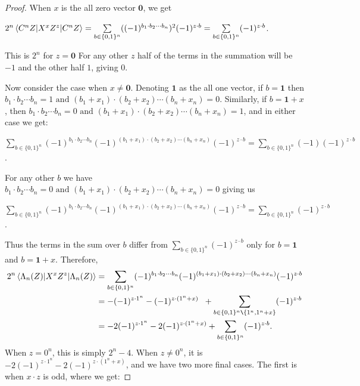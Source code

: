 \documentclass[12pt]{dalthesis}
\begin{document}
\begin{proof}
When $x$ is the all zero vector $\textbf{0}$, we get 
\begin{center}
$2^n\braket{C^n Z|X^xZ^z|C^n Z} = \sum\limits_{b \in \{0, 1\}^n} ((-1)^{b_1 \cdot b_2 \cdots b_n})^2  (-1)^{z \cdot b} = \sum\limits_{b \in \{0, 1\}^n} (-1)^{z \cdot b}$.
\end{center} This is $2^n$ for $z = \textbf{0}$
 For any other $z$ half of the terms in the summation will be $-1$ and the other half $1$, giving $0$. 

Now consider the case when $x \neq \textbf{0}$. Denoting $\textbf{1}$ as the all one vector, if $b = \textbf{1}$ then $b_1 \cdot b_2 \cdots b_n = 1 \mbox{ and } (b_1 + x_1) \cdot (b_2 + x_2) \cdots (b_n + x_n) = 0$. Similarly, if $b = \textbf{1} + x$, then $b_1 \cdot b_2 \cdots b_n = 0 \mbox{ and } (b_1 + x_1) \cdot (b_2 + x_2) \cdots (b_n + x_n) = 1$, and in either case we get: 
\begin{center}
$\sum\limits_{b \in \{0, 1\}^n} (-1)^{b_1 \cdot b_2 \cdots b_n} (-1)^{(b_1 + x_1) \cdot (b_2 + x_2) \cdots (b_n + x_n)} (-1)^{z \cdot b} = \sum\limits_{b \in \{0, 1\}^n} (-1) (-1)^{z \cdot b}$.
\end{center}
For any other $b$ we have $b_1 \cdot b_2 \cdots b_n = 0 \mbox{ and } (b_1 + x_1) \cdot (b_2 + x_2) \cdots (b_n + x_n) = 0$ giving us 
\begin{center}
$\sum\limits_{b \in \{0, 1\}^n} (-1)^{b_1 \cdot b_2 \cdots b_n} (-1)^{(b_1 + x_1) \cdot (b_2 + x_2) \cdots (b_n + x_n)} (-1)^{z \cdot b} = \sum\limits_{b \in \{0, 1\}^n} (-1)^{z \cdot b}$.
\end{center}
Thus the terms in the sum over $b$ differ from $\sum_{b \in \{0, 1\}^n} (-1)^{z \cdot b}$ only for $b = \textbf{1}$ and $b = \textbf{1} + x$. Therefore, 
\begin{equation*}
\begin{split}
2^n\braket{\Lambda_n (Z)|X^xZ^z|\Lambda_n (Z)} & = \sum\limits_{b \in \{0, 1\}^n} (-1)^{b_1 \cdot b_2 \cdots b_n} (-1)^{(b_1 + x_1) \cdot (b_2 + x_2) \cdots (b_n + x_n)} (-1)^{z \cdot b} \\
& = - (-1)^{z \cdot 1^n} - (-1)^{z \cdot (1^n + x)} \hspace{2mm} + \sum\limits_{b \in \{0, 1\}^n \texttt{\textbackslash} \{1^n, 1^n + x \} } (-1)^{z \cdot b}  \\
& = -2(-1)^{z \cdot 1^n} - 2(-1)^{z \cdot (1^n + x)} + \sum\limits_{b \in \{0, 1\}^n} (-1)^{z \cdot b}.
\end{split}
\end{equation*}
When $z = 0^n$, this is simply $2^n - 4$. When $z \neq 0^n$, it is $-2(-1)^{z \cdot 1^n} - 2(-1)^{z \cdot (1^n + x)}$, and we have two more final cases. The first is when $x \cdot z$ is odd, where we get:

\end{proof}
\end{document}
